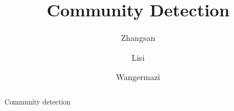 \documentclass[a4paper,fleqn]{cas-dc}
\begin{document}
\begin{sloppypar}
	\let\WriteBookmarks\relax
	\def\floatpagepagefraction{1}
	\def\textpagefraction{.001}
	\let\printorcid\relax
	\shorttitle{}

	\title [mode = title]{Community Detection}




	\author[1]{\textcolor[RGB]{0,0,1}{Zhangsan}}
	\fnmark[1]


	\author[1]{\textcolor[RGB]{0,0,1}{Lisi}}
	\fnmark[1] %
	\address[1]{School of Computer Science and Technology, ***, Chongqing 400065, China}
	\cormark[1]%

	\author[1]{\textcolor[RGB]{0,0,1}{Wangermazi}}







	\begin{abstract}
		Community detection 
	\end{abstract}


		

\end{sloppypar}
\end{document}
